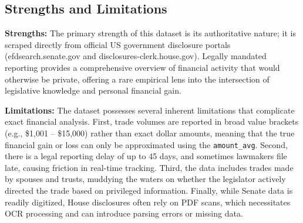 \documentclass{article}
\begin{document}
\subsection*{Strengths and Limitations}
\textbf{Strengths:} The primary strength of this dataset is its authoritative nature; it is scraped directly from official US government disclosure portals (efdsearch.senate.gov and disclosures-clerk.house.gov). Legally mandated reporting provides a comprehensive overview of financial activity that would otherwise be private, offering a rare empirical lens into the intersection of legislative knowledge and personal financial gain.

\textbf{Limitations:} The dataset possesses several inherent limitations that complicate exact financial analysis. First, trade volumes are reported in broad value brackets (e.g., \$1,001 -- \$15,000) rather than exact dollar amounts, meaning that the true financial gain or loss can only be approximated using the \texttt{amount\_avg}. Second, there is a legal reporting delay of up to 45 days, and sometimes lawmakers file late, causing friction in real-time tracking. Third, the data includes trades made by spouses and trusts, muddying the waters on whether the legislator actively directed the trade based on privileged information. Finally, while Senate data is readily digitized, House disclosures often rely on PDF scans, which necessitates OCR processing and can introduce parsing errors or missing data.
\end{document}
